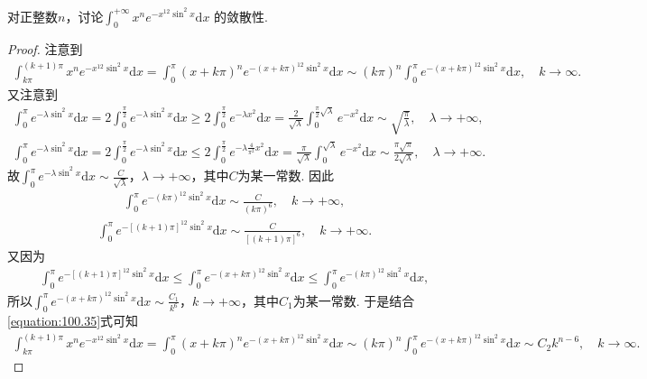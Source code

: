 \documentclass[../../main.tex]{subfiles}%
\begin{document}
\begin{example}
对正整数\(n\)，讨论$\int_{0}^{+\infty}x^{n}e^{-x^{12}\sin^{2}x}\mathrm{d}x$
的敛散性. 
\end{example}
\begin{proof}
注意到
\begin{align}\label{equation:100.35}
\int_{k\pi}^{(k+1)\pi}x^ne^{-x^{12}\sin^2x}\mathrm{d}x=\int_0^{\pi}(x+k\pi)^ne^{-(x+k\pi)^{12}\sin^2x}\mathrm{d}x\sim (k\pi)^n\int_0^{\pi}e^{-(x+k\pi)^{12}\sin^2x}\mathrm{d}x,\quad k\rightarrow \infty.
\end{align}
又注意到
\begin{align*}
\int_0^{\pi}e^{-\lambda \sin^2x}\mathrm{d}x=2\int_0^{\frac{\pi}{2}}e^{-\lambda \sin^2x}\mathrm{d}x\geqslant 2\int_0^{\frac{\pi}{2}}e^{-\lambda x^2}\mathrm{d}x=\frac{2}{\sqrt{\lambda}}\int_0^{\frac{\pi}{2}\sqrt{\lambda}}e^{-x^2}\mathrm{d}x\sim \sqrt{\frac{\pi}{\lambda}},\quad \lambda \rightarrow +\infty,
\end{align*}
\begin{align*}
\int_0^{\pi}e^{-\lambda \sin^2x}\mathrm{d}x=2\int_0^{\frac{\pi}{2}}e^{-\lambda \sin^2x}\mathrm{d}x\leqslant 2\int_0^{\frac{\pi}{2}}e^{-\lambda \frac{4}{\pi^2}x^2}\mathrm{d}x=\frac{\pi}{\sqrt{\lambda}}\int_0^{\sqrt{\lambda}}e^{-x^2}\mathrm{d}x\sim \frac{\pi \sqrt{\pi}}{2\sqrt{\lambda}},\quad \lambda \rightarrow +\infty.
\end{align*}
故$\int_0^{\pi}e^{-\lambda \sin^2x}\mathrm{d}x\sim \frac{C}{\sqrt{\lambda}}$，$\lambda \rightarrow +\infty$，其中$C$为某一常数. 因此
\begin{align*}
\int_0^{\pi}e^{-(k\pi)^{12}\sin^2x}\mathrm{d}x\sim \frac{C}{(k\pi)^6},\quad k\rightarrow +\infty,
\end{align*}
\begin{align*}
\int_0^{\pi}e^{-[(k+1)\pi]^{12}\sin^2x}\mathrm{d}x\sim \frac{C}{[(k+1)\pi]^6},\quad k\rightarrow +\infty.
\end{align*}
又因为
\begin{align*}
\int_0^{\pi}e^{-[(k+1)\pi]^{12}\sin^2x}\mathrm{d}x\leqslant \int_0^{\pi}e^{-(x+k\pi)^{12}\sin^2x}\mathrm{d}x\leqslant \int_0^{\pi}e^{-(k\pi)^{12}\sin^2x}\mathrm{d}x,
\end{align*}
所以$\int_0^{\pi}e^{-(x+k\pi)^{12}\sin^2x}\mathrm{d}x\sim \frac{C_1}{k^6}$，$k\rightarrow +\infty$，其中$C_1$为某一常数. 于是结合\eqref{equation:100.35}式可知
\begin{align*}
\int_{k\pi}^{(k+1)\pi}x^ne^{-x^{12}\sin^2x}\mathrm{d}x=\int_0^{\pi}(x+k\pi)^ne^{-(x+k\pi)^{12}\sin^2x}\mathrm{d}x\sim (k\pi)^n\int_0^{\pi}e^{-(x+k\pi)^{12}\sin^2x}\mathrm{d}x\sim C_2k^{n-6},\quad k\rightarrow \infty.

\end{align*}
\end{proof}
\end{document}
